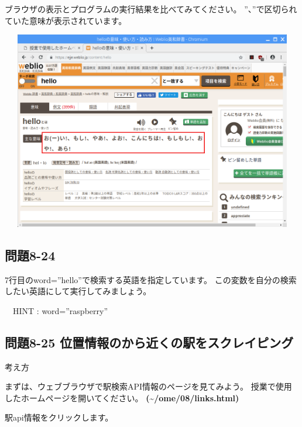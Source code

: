 \documentclass[a4paper,12pt,dvipdfmx]{jarticle}
\begin{document}
\bigskip


\bigskip

ブラウザの表示とプログラムの実行結果を比べてみてください。
”、”で区切られていた意味が表示されています。



\begin{center}
\includegraphics[width=17.006cm,height=8.698cm]{textbook-img046.png}

\end{center}
\subsection*{問題8-24}
7行目のword=”hello”で検索する英語を指定しています。
この変数を自分の検索したい英語にして実行してみましょう。

\ \ HINT : word=”raspberry”


\bigskip

\clearpage\subsection*{問題8-25
位置情報のから近くの駅をスクレイピング}
考え方

まずは、ウェブブラウザで駅検索API情報のページを見てみよう。
授業で使用したホームページを開いてください。
\textbf{(\~{}/ome/08/links.html)}

駅api情報をクリックします。 
\end{document}
